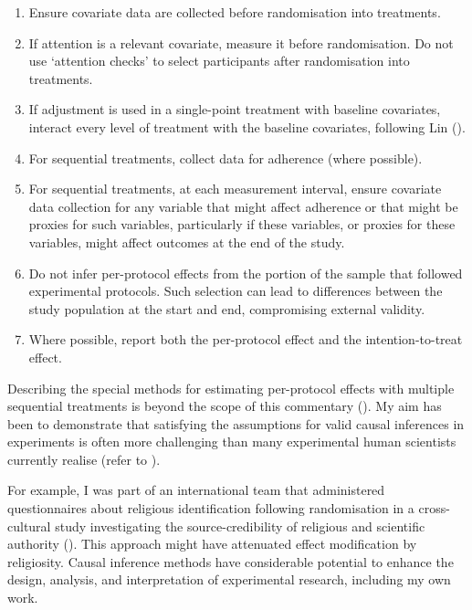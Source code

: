 \documentclass[
  single column]{article}
\providecommand{\tightlist}{%
  \setlength{\itemsep}{0pt}\setlength{\parskip}{0pt}}\usepackage{longtable,booktabs,array}
\begin{document}
\begin{enumerate}
\def\labelenumi{\arabic{enumi}.}
\tightlist
\item
  Ensure covariate data are collected before randomisation into
  treatments.
\item
  If attention is a relevant covariate, measure it before randomisation.
  Do not use `attention checks' to select participants after
  randomisation into treatments.
\item
  If adjustment is used in a single-point treatment with baseline
  covariates, interact every level of treatment with the baseline
  covariates, following Lin
  ().
\item
  For sequential treatments, collect data for adherence (where
  possible).
\item
  For sequential treatments, at each measurement interval, ensure
  covariate data collection for any variable that might affect adherence
  or that might be proxies for such variables, particularly if these
  variables, or proxies for these variables, might affect outcomes at
  the end of the study.
\item
  Do not infer per-protocol effects from the portion of the sample that
  followed experimental protocols. Such selection can lead to
  differences between the study population at the start and end,
  compromising external validity.
\item
  Where possible, report both the per-protocol effect and the
  intention-to-treat effect.
\end{enumerate}

Describing the special methods for estimating per-protocol effects with
multiple sequential treatments is beyond the scope of this commentary
(). My aim has
been to demonstrate that satisfying the assumptions for valid causal
inferences in experiments is often more challenging than many
experimental human scientists currently realise (refer to
).

For example, I was part of an international team that administered
questionnaires about religious identification following randomisation in
a cross-cultural study investigating the source-credibility of religious
and scientific authority (). This approach might have attenuated effect modification
by religiosity. Causal inference methods have considerable potential to
enhance the design, analysis, and interpretation of experimental
research, including my own work.
\end{document}
